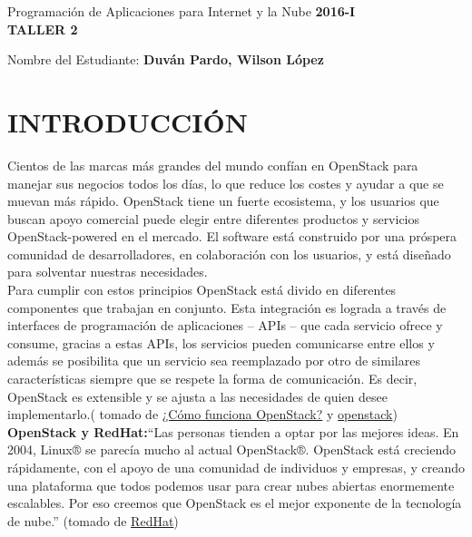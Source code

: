 \documentclass[10pt]{article}   			%
\begin{document}
	\renewcommand{\headrulewidth}{0.5pt}

	\thispagestyle{empty}						%
	\begin{center}
		\large {Programación de Aplicaciones para Internet y la Nube
			\hspace{5 cm}\textbf{2016-I}}
		\bigskip  
		\textbf{
				\LARGE{\\TALLER 2}}\\								%
	\end{center}	
	\begin{flushright}	
		\bigskip	
		Nombre del Estudiante: \textbf{Duván Pardo, Wilson López}			%
	\end{flushright} 

\section{INTRODUCCIÓN}	
Cientos de las marcas más grandes del mundo confían en OpenStack para manejar sus negocios todos los días, lo que reduce los costes y ayudar a que se muevan más rápido. OpenStack tiene un fuerte ecosistema, y los usuarios que buscan apoyo comercial puede elegir entre diferentes productos y servicios OpenStack-powered en el mercado. El software está construido por una próspera comunidad de desarrolladores, en colaboración con los usuarios, y está diseñado para solventar nuestras necesidades.\\


Para cumplir con estos principios OpenStack está divido en diferentes componentes que trabajan en conjunto. Esta integración es lograda a través de interfaces de programación de aplicaciones – APIs – que cada servicio ofrece y consume, gracias a estas APIs, los servicios pueden comunicarse entre ellos y además se posibilita que un servicio sea reemplazado por otro de similares características siempre que se respete la forma de comunicación. Es decir, OpenStack es extensible y se ajusta a las necesidades de quien desee implementarlo.( tomado de \href{http://vmartinezdelacruz.com/en-pocas-palabras-como-funciona-openstack/}{¿Cómo funciona OpenStack?} y \href{https://www.openstack.org/}{openstack})\\

\textbf{OpenStack y RedHat:}“Las personas tienden a optar por las mejores ideas. En 2004, Linux® se parecía mucho al actual OpenStack®. OpenStack está creciendo rápidamente, con el apoyo de una comunidad de individuos y empresas, y creando una plataforma que todos podemos usar para crear nubes abiertas enormemente escalables. Por eso creemos que OpenStack es el mejor exponente de la tecnología de nube.” (tomado de \href{https://www.redhat.com/es/insights/openstack}{RedHat})
\end{document}
